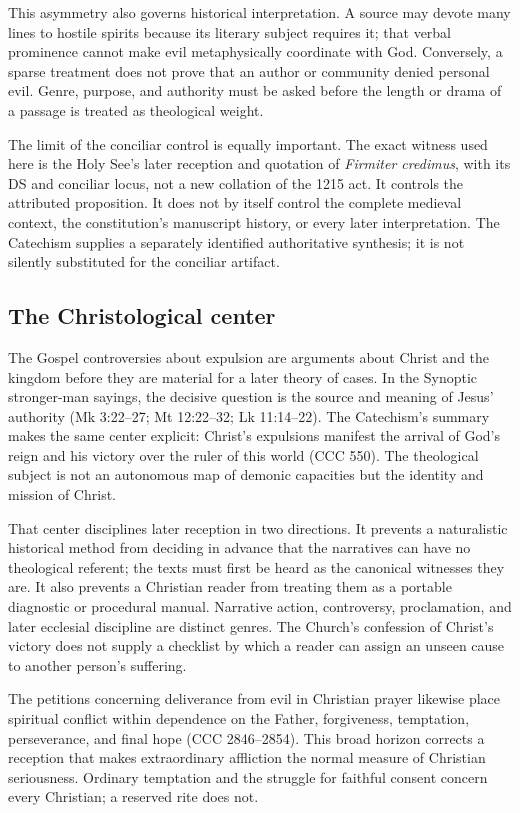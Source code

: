This asymmetry also governs historical interpretation. A source may devote
many lines to hostile spirits because its literary subject requires it; that
verbal prominence cannot make evil metaphysically coordinate with God.
Conversely, a sparse treatment does not prove that an author or community
denied personal evil. Genre, purpose, and authority must be asked before the
length or drama of a passage is treated as theological weight.

The limit of the conciliar control is equally important. The exact witness
used here is the Holy See's later reception and quotation of
\emph{Firmiter credimus}, with its DS and conciliar locus, not a new collation
of the 1215 act. It controls the attributed proposition. It does not by itself
control the complete medieval context, the constitution's manuscript history,
or every later interpretation. The Catechism supplies a separately identified
authoritative synthesis; it is not silently substituted for the conciliar
artifact.

\subsection{The Christological center}

The Gospel controversies about expulsion are arguments about Christ and the
kingdom before they are material for a later theory of cases. In the Synoptic
stronger-man sayings, the decisive question is the source and meaning of
Jesus' authority (Mk 3:22--27; Mt 12:22--32; Lk 11:14--22). The Catechism's
summary makes the same center explicit: Christ's expulsions manifest the
arrival of God's reign and his victory over the ruler of this world (CCC 550).
The theological subject is not an autonomous map of demonic capacities but
the identity and mission of Christ.

That center disciplines later reception in two directions. It prevents a
naturalistic historical method from deciding in advance that the narratives
can have no theological referent; the texts must first be heard as the
canonical witnesses they are. It also prevents a Christian reader from
treating them as a portable diagnostic or procedural manual. Narrative action,
controversy, proclamation, and later ecclesial discipline are distinct genres.
The Church's confession of Christ's victory does not supply a checklist by
which a reader can assign an unseen cause to another person's suffering.

The petitions concerning deliverance from evil in Christian prayer likewise
place spiritual conflict within dependence on the Father, forgiveness,
temptation, perseverance, and final hope (CCC 2846--2854). This broad horizon
corrects a reception that makes extraordinary affliction the normal measure of
Christian seriousness. Ordinary temptation and the struggle for faithful
consent concern every Christian; a reserved rite does not.

